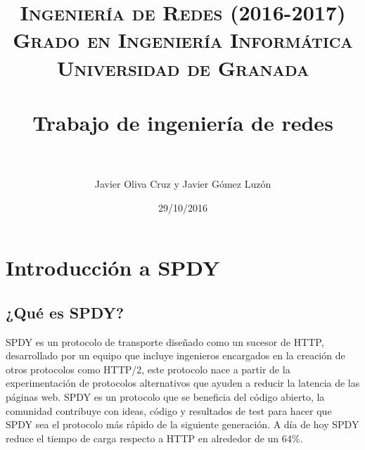 
\usepackage{cite}
\usepackage{hyperref}
\usepackage{titlesec}
\title{ 
\normalfont \normalsize 
\textsc{\textbf{Ingeniería de Redes (2016-2017)} \\ Grado en Ingeniería Informática \\ Universidad de Granada} \\ [25pt] %
\horrule{0.5pt} \\[0.4cm] %
\huge Trabajo de ingeniería de redes \\ %
\horrule{2pt} \\[0.5cm] %
}
\author{Javier Oliva Cruz y Javier Gómez Luzón} %
\date{29/10/2016} %
\newpage

\maketitle
\pagebreak
\tableofcontents
\listoffigures
\pagebreak
\section{Introducción a SPDY}
\subsection{¿Qué es SPDY?}
SPDY es un protocolo de transporte diseñado como un sucesor de HTTP, desarrollado por un equipo que incluye ingenieros encargados en la creación de otros protocolos como HTTP/2, este protocolo nace a partir de la experimentación de protocolos alternativos que ayuden a reducir la latencia de las páginas web. SPDY es un protocolo que se beneficia del código abierto, la comunidad contribuye con ideas, código y resultados de test para hacer que SPDY sea el protocolo más rápido de la siguiente generación. A día de hoy SPDY reduce el tiempo de carga respecto a HTTP en alrededor de un 64\%.
\\
